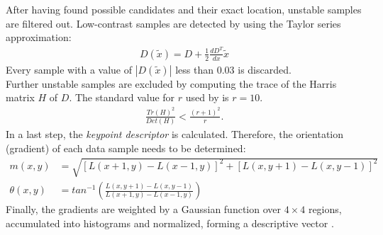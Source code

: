 \documentclass[a4paper, 11pt]{article} %
\begin{document}
After having found possible candidates and their exact location, unstable samples are filtered out. Low-contrast samples are detected by using the Taylor series approximation:
\begin{align}
D(\widetilde{x}) = D + \frac{1}{2} \frac{dD^T}{dx} \widetilde{x}
\end{align}
Every sample with a value of $|D(\widetilde{x})|$ less than 0.03 is discarded.\\
Further unstable samples are excluded by computing the trace of the Harris matrix $H$ of $D$. The standard value for $r$ used by \citeauthor{lowe2004distinctive} is $r = 10$.
\begin{align}
\frac{Tr(H)^2}{Det(H)} < \frac{(r+1)^2}{r}.
\end{align}
In a last step, the \textit{keypoint descriptor} is calculated. Therefore, the orientation (gradient) of each data sample needs to be determined:
\begin{align}
m(x,y) &= \sqrt{[L(x+1,y) -L(x-1,y)]^2 + [L(x,y+1) - L(x,y-1)]^2 }\\
\theta(x,y) &= tan^{-1}\left(\frac{L(x,y+1) - L(x,y-1)}{L(x+1,y) - L(x-1,y)} \right)
\end{align}
Finally, the gradients are weighted by a Gaussian function over $4 \times 4$ regions, accumulated into histograms and normalized, forming a descriptive vector \cite{lowe2004distinctive}. 
\end{document}
